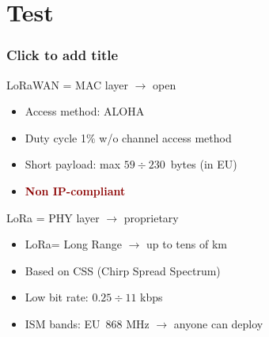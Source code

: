\section{Test}

	\begin{frame}
		\frametitle{Click to add title}
		
		\begin{craneblock}{LoRaWAN = MAC layer $\rightarrow$ open}
			\begin{itemize}[itemsep=2mm]
				\vspace{1mm}
				\item[] Access method: ALOHA
				\item[] Duty cycle 1$\%$ w/o channel access method
				\item[] Short payload: max $59\div230$~bytes (in EU)
				\item[] \textcolor{darkred}{\bfseries Non IP-compliant}
			\end{itemize}
		\end{craneblock}
		
		\begin{block}{LoRa = PHY layer $\rightarrow$ proprietary}
			\vspace{1mm}
			\begin{itemize}[itemsep=2mm]
			\item[] LoRa= Long Range $\rightarrow$ up to tens of km
			\item[] Based on CSS (Chirp Spread Spectrum)\\
			\item[] Low bit rate: $0.25\div11$ kbps\\
			\item[] ISM bands: EU~868 MHz $\rightarrow$ anyone can deploy\\
			\end{itemize}
		\end{block}
	
	\end{frame}